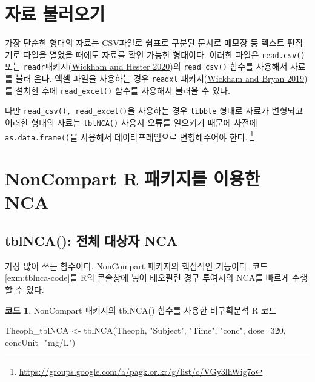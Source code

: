 \documentclass[
  11pt,
  krantz2, a4paper, twoside]{krantz}
\newenvironment{Shaded}{\begin{snugshade}}{\end{snugshade}}
\newcommand{\AttributeTok}[1]{\textcolor[rgb]{0.77,0.63,0.00}{#1}}
\newcommand{\DecValTok}[1]{\textcolor[rgb]{0.00,0.00,0.81}{#1}}
\newcommand{\FunctionTok}[1]{\textcolor[rgb]{0.00,0.00,0.00}{#1}}
\newcommand{\NormalTok}[1]{#1}
\newcommand{\OtherTok}[1]{\textcolor[rgb]{0.56,0.35,0.01}{#1}}
\newcommand{\StringTok}[1]{\textcolor[rgb]{0.31,0.60,0.02}{#1}}
\theoremstyle{definition}
\theoremstyle{definition}
\newtheorem{example}{코드}[chapter]
\theoremstyle{definition}
\theoremstyle{definition}
\theoremstyle{remark}
\begin{document}
\hypertarget{loading}{%
\section{자료 불러오기}\label{loading}}

가장 단순한 형태의 자료는 CSV파일로 쉼표로 구분된 문서로 메모장 등 텍스트 편집기로 파일을 열었을 때에도 자료를 확인 가능한 형태이다.
이러한 파일은 \texttt{read.csv()} 또는 \texttt{readr}패키지(\protect\hyperlink{ref-R-readr}{Wickham and Hester 2020})의 \texttt{read\_csv()} 함수를 사용해서 자료를 불러 온다.
엑셀 파일을 사용하는 경우 \texttt{readxl} 패키지(\protect\hyperlink{ref-R-readxl}{Wickham and Bryan 2019})를 설치한 후에 \texttt{read\_excel()} 함수를 사용해서 불러올 수 있다.

다만 \texttt{read\_csv(),\ read\_excel()}을 사용하는 경우 \texttt{tibble} 형태로 자료가 변형되고 이러한 형태의 자료는 \texttt{tblNCA()} 사용시 오류를 일으키기 때문에 사전에 \texttt{as.data.frame()}을 사용해서 데이타프레임으로 변형해주어야 한다. \footnote{\url{https://groups.google.com/a/pagk.or.kr/g/list/c/VGy3lhWig7o}}

\hypertarget{noncompart-r-uxd328uxd0a4uxc9c0uxb97c-uxc774uxc6a9uxd55c-nca}{%
\section{NonCompart R 패키지를 이용한 NCA}\label{noncompart-r-uxd328uxd0a4uxc9c0uxb97c-uxc774uxc6a9uxd55c-nca}}

\hypertarget{tblNCA}{%
\subsection{tblNCA(): 전체 대상자 NCA}\label{tblNCA}}

가장 많이 쓰는 함수이다.
NonCompart 패키지의 핵심적인 기능이다.
코드 \ref{exm:tblnca-code}를 R의 콘솔창에 넣어 테오필린 경구 투여시의 NCA를 빠르게 수행할 수 있다.

\begin{example}
\protect\hypertarget{exm:tblnca-code}{}{\label{exm:tblnca-code} }NonCompart 패키지의 tblNCA() 함수를 사용한 비구획분석 R 코드
\end{example}
\vspace{-2ex}

\begin{Shaded}
\begin{Highlighting}[]
\NormalTok{Theoph\_tblNCA }\OtherTok{\textless{}{-}} \FunctionTok{tblNCA}\NormalTok{(Theoph, }\StringTok{"Subject"}\NormalTok{, }\StringTok{"Time"}\NormalTok{, }\StringTok{"conc"}\NormalTok{, }
                        \AttributeTok{dose=}\DecValTok{320}\NormalTok{, }\AttributeTok{concUnit=}\StringTok{"mg/L"}\NormalTok{)}
\end{Highlighting}
\end{Shaded}
\end{document}
